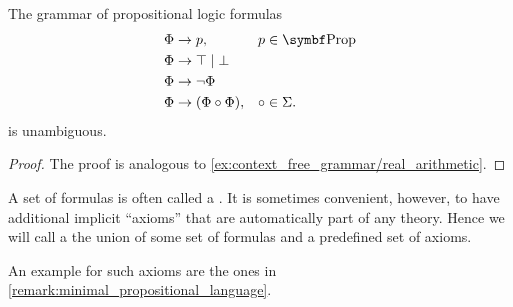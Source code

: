 \begin{proposition}\label{thm:propositional_formulas_are_unambiguous}
  The grammar of propositional logic formulas
  \begin{displaymath}
    \begin{aligned}
      &\Phi \to p,                 &&p \in \Bold{Prop} \\
      &\Phi \to \top \;|\; \bot    && \\
      &\Phi \to \neg \Phi          && \\
      &\Phi \to (\Phi \circ \Phi), &&\circ \in \Sigma.
    \end{aligned}
  \end{displaymath}
  is unambiguous.
\end{proposition}
\begin{proof}
  The proof is analogous to \cref{ex:context_free_grammar/real_arithmetic}.
\end{proof}

\begin{definition}\label{def:propositional_theory}
  A set of formulas is often called a . It is sometimes convenient, however, to have additional implicit \enquote{axioms} that are automatically part of any theory. Hence we will call a  the union of some set of formulas and a predefined set of axioms.

  An example for such axioms are the ones in \cref{remark:minimal_propositional_language}.
\end{definition}

